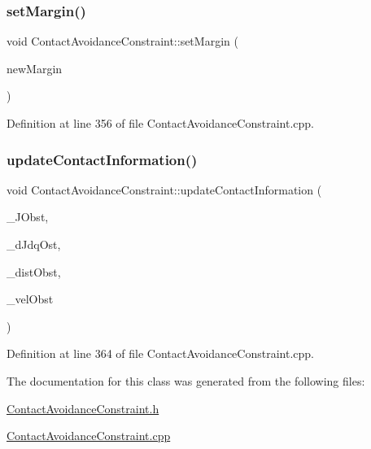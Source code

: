 \subsubsection{\texorpdfstring{set\+Margin()}{setMargin()}}
{\footnotesize\ttfamily void Contact\+Avoidance\+Constraint\+::set\+Margin (\begin{DoxyParamCaption}\item[{double}]{new\+Margin }\end{DoxyParamCaption})}



Definition at line 356 of file Contact\+Avoidance\+Constraint.\+cpp.

\hypertarget{classocra_1_1ContactAvoidanceConstraint_a3d44cd52a5de9bc2d69da19b29a5d7f7}{}\label{classocra_1_1ContactAvoidanceConstraint_a3d44cd52a5de9bc2d69da19b29a5d7f7} 
\subsubsection{\texorpdfstring{update\+Contact\+Information()}{updateContactInformation()}}
{\footnotesize\ttfamily void Contact\+Avoidance\+Constraint\+::update\+Contact\+Information (\begin{DoxyParamCaption}\item[{const Eigen\+::\+Matrix\+Xd \&}]{\+\_\+\+J\+Obst,  }\item[{const Eigen\+::\+Vector\+Xd \&}]{\+\_\+d\+Jdq\+Ost,  }\item[{const Eigen\+::\+Vector\+Xd \&}]{\+\_\+dist\+Obst,  }\item[{const Eigen\+::\+Vector\+Xd \&}]{\+\_\+vel\+Obst }\end{DoxyParamCaption})}



Definition at line 364 of file Contact\+Avoidance\+Constraint.\+cpp.



The documentation for this class was generated from the following files\+:\begin{DoxyCompactItemize}
\item 
\hyperlink{ContactAvoidanceConstraint_8h}{Contact\+Avoidance\+Constraint.\+h}\item 
\hyperlink{ContactAvoidanceConstraint_8cpp}{Contact\+Avoidance\+Constraint.\+cpp}\end{DoxyCompactItemize}
